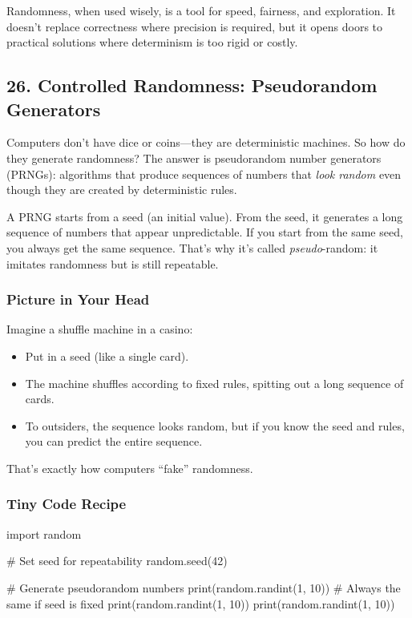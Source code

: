 \documentclass[
  letterpaper,
  DIV=11,
  numbers=noendperiod]{scrreprt}
\newenvironment{Shaded}{\begin{snugshade}}{\end{snugshade}}
\newcommand{\BuiltInTok}[1]{\textcolor[rgb]{0.00,0.23,0.31}{#1}}
\newcommand{\CommentTok}[1]{\textcolor[rgb]{0.37,0.37,0.37}{#1}}
\newcommand{\DecValTok}[1]{\textcolor[rgb]{0.68,0.00,0.00}{#1}}
\newcommand{\ImportTok}[1]{\textcolor[rgb]{0.00,0.46,0.62}{#1}}
\newcommand{\NormalTok}[1]{\textcolor[rgb]{0.00,0.23,0.31}{#1}}
\providecommand{\tightlist}{%
  \setlength{\itemsep}{0pt}\setlength{\parskip}{0pt}}
\begin{document}
Randomness, when used wisely, is a tool for speed, fairness, and
exploration. It doesn't replace correctness where precision is required,
but it opens doors to practical solutions where determinism is too rigid
or costly.

\subsection{26. Controlled Randomness: Pseudorandom
Generators}\label{controlled-randomness-pseudorandom-generators}

Computers don't have dice or coins---they are deterministic machines. So
how do they generate randomness? The answer is pseudorandom number
generators (PRNGs): algorithms that produce sequences of numbers that
\emph{look random} even though they are created by deterministic rules.

A PRNG starts from a seed (an initial value). From the seed, it
generates a long sequence of numbers that appear unpredictable. If you
start from the same seed, you always get the same sequence. That's why
it's called \emph{pseudo}-random: it imitates randomness but is still
repeatable.

\subsubsection{Picture in Your Head}\label{picture-in-your-head-25}

Imagine a shuffle machine in a casino:

\begin{itemize}
\tightlist
\item
  Put in a seed (like a single card).
\item
  The machine shuffles according to fixed rules, spitting out a long
  sequence of cards.
\item
  To outsiders, the sequence looks random, but if you know the seed and
  rules, you can predict the entire sequence.
\end{itemize}

That's exactly how computers ``fake'' randomness.

\subsubsection{Tiny Code Recipe}\label{tiny-code-recipe-23}

\begin{Shaded}
\begin{Highlighting}[]
\ImportTok{import}\NormalTok{ random}

\CommentTok{\# Set seed for repeatability}
\NormalTok{random.seed(}\DecValTok{42}\NormalTok{)}

\CommentTok{\# Generate pseudorandom numbers}
\BuiltInTok{print}\NormalTok{(random.randint(}\DecValTok{1}\NormalTok{, }\DecValTok{10}\NormalTok{))  }\CommentTok{\# Always the same if seed is fixed}
\BuiltInTok{print}\NormalTok{(random.randint(}\DecValTok{1}\NormalTok{, }\DecValTok{10}\NormalTok{))}
\BuiltInTok{print}\NormalTok{(random.randint(}\DecValTok{1}\NormalTok{, }\DecValTok{10}\NormalTok{))}
\end{Highlighting}
\end{Shaded}
\end{document}
